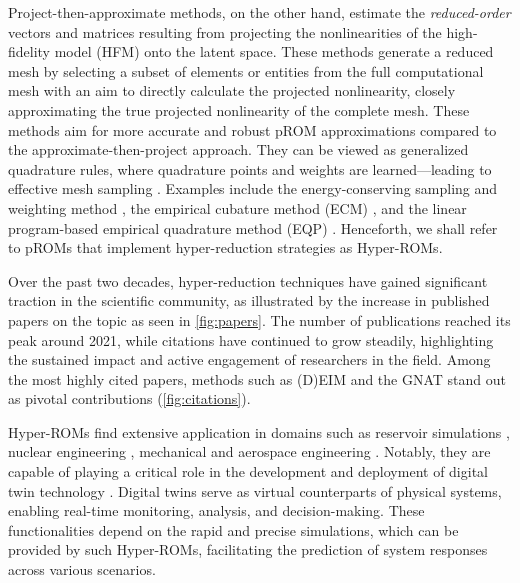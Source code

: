 \documentclass[11pt]{article}
\begin{document}
    Project-then-approximate methods, on the other hand, estimate the \textit{reduced-order} vectors and matrices resulting from projecting the nonlinearities of the high-fidelity model (HFM) onto the latent space.
    These methods generate a reduced mesh by selecting a subset of elements or entities from the full computational mesh with an aim to directly calculate the projected nonlinearity, closely approximating the true projected nonlinearity of the complete mesh.
    These methods aim for more accurate and robust pROM approximations compared to the approximate-then-project approach.
    They can be viewed as generalized quadrature rules, where quadrature points and weights are learned—leading to effective mesh sampling \cite{chapman2016accelerated}.
    Examples include the energy-conserving sampling and weighting method \cite{farhat2015structure-preserving,tezaur2022robust,maierhofer2022model,farhat2014dimensional}, the empirical cubature method (ECM) \cite{hernandez2014high,bravo2024subspace,hernandez2020multiscale,hernandez2024cecm}, and the linear program-based empirical quadrature method (EQP) \cite{yano2019lp}.
    Henceforth, we shall refer to pROMs that implement hyper-reduction strategies as Hyper-ROMs.



    Over the past two decades, hyper-reduction techniques have gained significant traction in the scientific community, as illustrated by the increase in published papers on the topic as seen in \cref{fig:papers}.
    The number of publications reached its peak around 2021, while citations have continued to grow steadily, highlighting the sustained impact and active engagement of researchers in the field.
    Among the most highly cited papers, methods such as (D)EIM  and the GNAT \cite{carlberg2013gnat,jiang2019implementation} stand out as pivotal contributions (\cref{fig:citations}).

    Hyper-ROMs find extensive application in domains such as reservoir simulations \cite{Jansen_2016,ghasemi2016localized,yoon2016hyper-reduced-order,Tan_2018,Jiang_2019_gnat,ghommem2016complexity,he2014reduced}, nuclear engineering \cite{german2019application,tano2021evaluation}, mechanical and aerospace engineering \cite{tiso2013discrete,antil2014application,farhat2014dimensional,hernandez2017dimensional,farhat2021_5_bookchapter,farhat2015structure-preserving,grimberg2021mesh}.%
    Notably, they are capable of playing a critical role in the development and deployment of digital twin technology \cite{sharma2022digital,botin-sanabria2022digital,liu2021review,kapteyn2020toward}.
    Digital twins serve as virtual counterparts of physical systems, enabling real-time monitoring, analysis, and decision-making.
    These functionalities depend on the rapid and precise simulations, which can be provided by such Hyper-ROMs,  facilitating the prediction of system responses across various scenarios.
\end{document}
